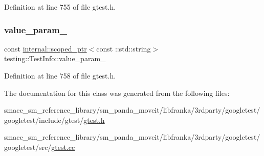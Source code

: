 Definition at line 755 of file gtest.\+h.

\mbox{\label{classtesting_1_1TestInfo_ac3dd68ea96ebe82c6eab31e6e730a918}} 
\subsubsection{\texorpdfstring{value\+\_\+param\+\_\+}{value\_param\_}}
{\footnotesize\ttfamily const \hyperlink{classtesting_1_1internal_1_1scoped__ptr}{internal\+::scoped\+\_\+ptr}$<$const \+::std\+::string$>$ testing\+::\+Test\+Info\+::value\+\_\+param\+\_\+\hspace{0.3cm}{\ttfamily [private]}}



Definition at line 758 of file gtest.\+h.



The documentation for this class was generated from the following files\+:\begin{DoxyCompactItemize}
\item 
smacc\+\_\+sm\+\_\+reference\+\_\+library/sm\+\_\+panda\+\_\+moveit/libfranka/3rdparty/googletest/googletest/include/gtest/\hyperlink{gtest_8h}{gtest.\+h}\item 
smacc\+\_\+sm\+\_\+reference\+\_\+library/sm\+\_\+panda\+\_\+moveit/libfranka/3rdparty/googletest/googletest/src/\hyperlink{gtest_8cc}{gtest.\+cc}\end{DoxyCompactItemize}
